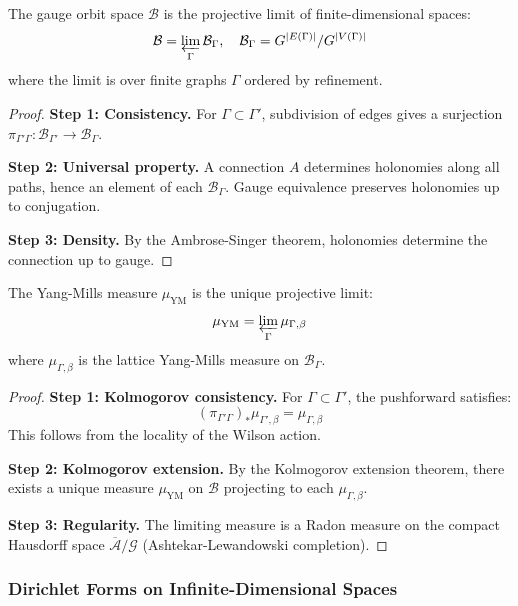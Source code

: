 \begin{theorem}
\label{thm:projective-limit}
The gauge orbit space $\mathcal{B}$ is the projective limit of finite-dimensional spaces:
\[
\mathcal{B} = \varprojlim_{\Gamma} \mathcal{B}_\Gamma, \quad 
\mathcal{B}_\Gamma = G^{|E(\Gamma)|} / G^{|V(\Gamma)|}
\]
where the limit is over finite graphs $\Gamma$ ordered by refinement.
\end{theorem}

\begin{proof}
\textbf{Step 1: Consistency.}
For $\Gamma \subset \Gamma'$, subdivision of edges gives a surjection 
$\pi_{\Gamma'\Gamma}: \mathcal{B}_{\Gamma'} \to \mathcal{B}_\Gamma$.

\textbf{Step 2: Universal property.}
A connection $A$ determines holonomies along all paths, hence an element of 
each $\mathcal{B}_\Gamma$. Gauge equivalence preserves holonomies up to conjugation.

\textbf{Step 3: Density.}
By the Ambrose-Singer theorem, holonomies determine the connection up to gauge.
\end{proof}

\begin{theorem}
\label{thm:measure-projective}
The Yang-Mills measure $\mu_{\text{YM}}$ is the unique projective limit:
\[
\mu_{\text{YM}} = \varprojlim_{\Gamma} \mu_{\Gamma,\beta}
\]
where $\mu_{\Gamma,\beta}$ is the lattice Yang-Mills measure on $\mathcal{B}_\Gamma$.
\end{theorem}

\begin{proof}
\textbf{Step 1: Kolmogorov consistency.}
For $\Gamma \subset \Gamma'$, the pushforward satisfies:
\[
(\pi_{\Gamma'\Gamma})_* \mu_{\Gamma',\beta} = \mu_{\Gamma,\beta}
\]
This follows from the locality of the Wilson action.

\textbf{Step 2: Kolmogorov extension.}
By the Kolmogorov extension theorem, there exists a unique measure $\mu_{\text{YM}}$ 
on $\mathcal{B}$ projecting to each $\mu_{\Gamma,\beta}$.

\textbf{Step 3: Regularity.}
The limiting measure is a Radon measure on the compact Hausdorff space 
$\overline{\mathcal{A}}/\mathcal{G}$ (Ashtekar-Lewandowski completion).
\end{proof}

\subsubsection{Dirichlet Forms on Infinite-Dimensional Spaces}

